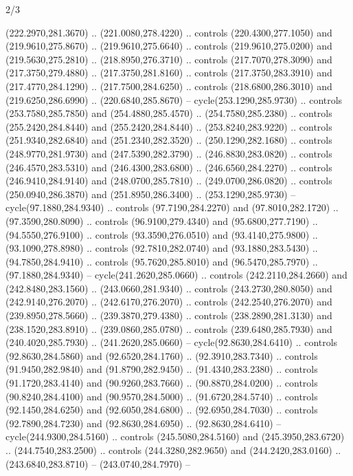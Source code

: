 \begin{flagdescription}{2/3}
\begin{scope}[xshift=0.5\flaglength,yshift=0.5\flagwidth,scale=\stretchfactor]
\begin{scope}[scale=0.001645\flagwidth,yshift=65mm,xshift=-63mm]
\begin{scope}[y=0.80pt, x=0.80pt, yscale=-1,]
\begin{scope}[cm={{1.33333,0.0,0.0,1.33333,(0.0,1e-05)}}]
  (222.2970,281.3670) .. (221.0080,278.4220) .. controls (220.4300,277.1050) and
  (219.9610,275.8670) .. (219.9610,275.6640) .. controls (219.9610,275.0200) and
  (219.5630,275.2810) .. (218.8950,276.3710) .. controls (217.7070,278.3090) and
  (217.3750,279.4880) .. (217.3750,281.8160) .. controls (217.3750,283.3910) and
  (217.4770,284.1290) .. (217.7500,284.6250) .. controls (218.6800,286.3010) and
  (219.6250,286.6990) .. (220.6840,285.8670) -- cycle(253.1290,285.9730) ..
  controls (253.7580,285.7850) and (254.4880,285.4570) .. (254.7580,285.2380) ..
  controls (255.2420,284.8440) and (255.2420,284.8440) .. (253.8240,283.9220) ..
  controls (251.9340,282.6840) and (251.2340,282.3520) .. (250.1290,282.1680) ..
  controls (248.9770,281.9730) and (247.5390,282.3790) .. (246.8830,283.0820) ..
  controls (246.4570,283.5310) and (246.4300,283.6800) .. (246.6560,284.2270) ..
  controls (246.9410,284.9140) and (248.0700,285.7810) .. (249.0700,286.0820) ..
  controls (250.0940,286.3870) and (251.8950,286.3400) .. (253.1290,285.9730) --
  cycle(97.1880,284.9340) .. controls (97.7190,284.2270) and (97.8010,282.1720)
  .. (97.3590,280.8090) .. controls (96.9100,279.4340) and (95.6800,277.7190) ..
  (94.5550,276.9100) .. controls (93.3590,276.0510) and (93.4140,275.9800) ..
  (93.1090,278.8980) .. controls (92.7810,282.0740) and (93.1880,283.5430) ..
  (94.7850,284.9410) .. controls (95.7620,285.8010) and (96.5470,285.7970) ..
  (97.1880,284.9340) -- cycle(241.2620,285.0660) .. controls (242.2110,284.2660)
  and (242.8480,283.1560) .. (243.0660,281.9340) .. controls (243.2730,280.8050)
  and (242.9140,276.2070) .. (242.6170,276.2070) .. controls (242.2540,276.2070)
  and (239.8950,278.5660) .. (239.3870,279.4380) .. controls (238.2890,281.3130)
  and (238.1520,283.8910) .. (239.0860,285.0780) .. controls (239.6480,285.7930)
  and (240.4020,285.7930) .. (241.2620,285.0660) -- cycle(92.8630,284.6410) ..
  controls (92.8630,284.5860) and (92.6520,284.1760) .. (92.3910,283.7340) ..
  controls (91.9450,282.9840) and (91.8790,282.9450) .. (91.4340,283.2380) ..
  controls (91.1720,283.4140) and (90.9260,283.7660) .. (90.8870,284.0200) ..
  controls (90.8240,284.4100) and (90.9570,284.5000) .. (91.6720,284.5740) ..
  controls (92.1450,284.6250) and (92.6050,284.6800) .. (92.6950,284.7030) ..
  controls (92.7890,284.7230) and (92.8630,284.6950) .. (92.8630,284.6410) --
  cycle(244.9300,284.5160) .. controls (245.5080,284.5160) and
  (245.3950,283.6720) .. (244.7540,283.2500) .. controls (244.3280,282.9650) and
  (244.2420,283.0160) .. (243.6840,283.8710) -- (243.0740,284.7970) --

\end{scope}
\end{scope}
\end{scope}
\end{scope}
\end{flagdescription}
